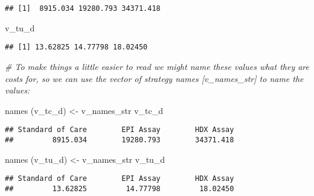 \documentclass[
]{article}
\newenvironment{Shaded}{\begin{snugshade}}{\end{snugshade}}
\newcommand{\CommentTok}[1]{\textcolor[rgb]{0.56,0.35,0.01}{\textit{#1}}}
\newcommand{\FunctionTok}[1]{\textcolor[rgb]{0.00,0.00,0.00}{#1}}
\newcommand{\NormalTok}[1]{#1}
\newcommand{\OtherTok}[1]{\textcolor[rgb]{0.56,0.35,0.01}{#1}}
\begin{document}
\begin{verbatim}
## [1]  8915.034 19280.793 34371.418
\end{verbatim}

\begin{Shaded}
\begin{Highlighting}[]
\NormalTok{v\_tu\_d}
\end{Highlighting}
\end{Shaded}

\begin{verbatim}
## [1] 13.62825 14.77798 18.02450
\end{verbatim}

\begin{Shaded}
\begin{Highlighting}[]
\CommentTok{\# To make things a little easier to read we might name these values what they are costs for, so we can use the vector of strategy names [v\_names\_str] to name the values:}

\FunctionTok{names}\NormalTok{ (v\_tc\_d) }\OtherTok{\textless{}{-}}\NormalTok{ v\_names\_str}
\NormalTok{v\_tc\_d}
\end{Highlighting}
\end{Shaded}

\begin{verbatim}
## Standard of Care        EPI Assay        HDX Assay 
##         8915.034        19280.793        34371.418
\end{verbatim}

\begin{Shaded}
\begin{Highlighting}[]
\FunctionTok{names}\NormalTok{ (v\_tu\_d) }\OtherTok{\textless{}{-}}\NormalTok{ v\_names\_str}
\NormalTok{v\_tu\_d}
\end{Highlighting}
\end{Shaded}

\begin{verbatim}
## Standard of Care        EPI Assay        HDX Assay 
##         13.62825         14.77798         18.02450
\end{verbatim}
\end{document}
